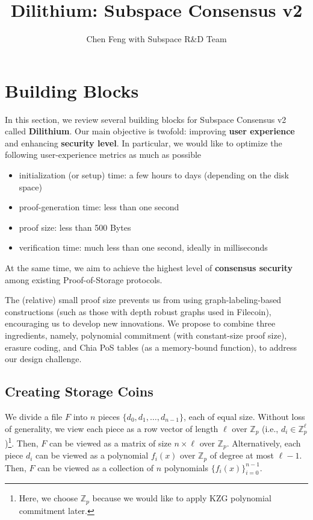 \documentclass[12pt,draftcls,onecolumn]{IEEEtran}
\title{Dilithium: Subspace Consensus v2}
\author{Chen Feng with Subspace R\&D Team}
\newcommand{\Fp}{\mathbb{Z}_p}
\begin{document}
\maketitle


\section{Building Blocks}

In this section, we review several building blocks for Subspace Consensus v2 called {\bf Dilithium}. 
Our main objective is twofold: improving {\bf user experience} and enhancing {\bf security level}.
In particular, we would like to optimize the following user-experience metrics as much as possible
\begin{itemize}
    \item initialization (or setup) time: a few hours to days (depending on the disk space)
    \item proof-generation time: less than one second
    \item proof size: less than 500 Bytes
    \item verification time: much less than one second, ideally in milliseconds
\end{itemize}
At the same time, we aim to achieve the highest level of {\bf consensus security} among existing Proof-of-Storage protocols. 

The (relative) small proof size prevents us from using graph-labeling-based constructions (such as those with depth robust graphs used in Filecoin), encouraging us to develop new innovations. We propose to combine three ingredients, namely, polynomial commitment (with constant-size proof size), erasure coding, and Chia PoS tables (as a memory-bound function), to address our design challenge.  

\subsection{Creating Storage Coins}

We divide a file $F$ into $n$ pieces $\{ d_0, d_1, \ldots, d_{n-1}\}$, each of equal size. 
Without loss of generality, we view each piece as a row vector of length $\ell$ over $\Fp$  (i.e., $d_i \in \Fp^\ell$)\footnote{Here, we choose $\Fp$ because we would like to apply KZG polynomial commitment later.}.
Then, $F$ can be viewed as a matrix of size $n \times \ell$ over $\Fp$.
Alternatively, each piece $d_i$ can be viewed as a polynomial $f_i(x)$ over $\Fp$ of degree at most $\ell - 1$. 
Then, $F$ can be viewed as a collection of $n$ polynomials $\{ f_i(x) \}_{i = 0}^{n-1}$. 
\end{document}
